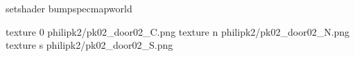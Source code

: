 setshader bumpspecmapworld

texture 0 philipk2/pk02_door02_C.png
texture n philipk2/pk02_door02_N.png
texture s philipk2/pk02_door02_S.png

